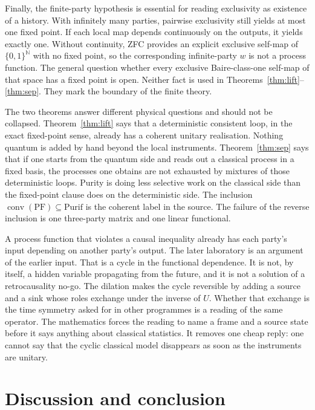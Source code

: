 \documentclass[11pt]{article}
\theoremstyle{definition}
\theoremstyle{remark}
\newcommand{\conv}{\operatorname{conv}}
\newcommand{\PF}{\mathrm{PF}}
\newcommand{\Purif}{\mathrm{Purif}}
\begin{document}
Finally, the finite-party hypothesis is essential for reading exclusivity as existence of a history. With infinitely many parties, pairwise exclusivity still yields at most one fixed point. If each local map depends continuously on the outputs, it yields exactly one. Without continuity, ZFC provides an explicit exclusive self-map of \(\{0,1\}^{\mathbb{N}}\) with no fixed point, so the corresponding infinite-party \(w\) is not a process function. The general question whether every exclusive Baire-class-one self-map of that space has a fixed point is open. Neither fact is used in Theorems~\ref{thm:lift}--\ref{thm:sep}. They mark the boundary of the finite theory.

The two theorems answer different physical questions and should not be collapsed. Theorem~\ref{thm:lift} says that a deterministic consistent loop, in the exact fixed-point sense, already has a coherent unitary realisation. Nothing quantum is added by hand beyond the local instruments. Theorem~\ref{thm:sep} says that if one starts from the quantum side and reads out a classical process in a fixed basis, the processes one obtains are not exhausted by mixtures of those deterministic loops. Purity is doing less selective work on the classical side than the fixed-point clause does on the deterministic side. The inclusion \(\conv(\PF)\subseteq\Purif\) is the coherent label in the source. The failure of the reverse inclusion is one three-party matrix and one linear functional.

A process function that violates a causal inequality already has each party's input depending on another party's output. The later laboratory is an argument of the earlier input. That is a cycle in the functional dependence. It is not, by itself, a hidden variable propagating from the future, and it is not a solution of a retrocausality no-go. The dilation makes the cycle reversible by adding a source and a sink whose roles exchange under the inverse of \(U\). Whether that exchange is the time symmetry asked for in other programmes is a reading of the same operator. The mathematics forces the reading to name a frame and a source state before it says anything about classical statistics. It removes one cheap reply: one cannot say that the cyclic classical model disappears as soon as the instruments are unitary.

\section{Discussion and conclusion}
\label{sec:disc}
\end{document}
